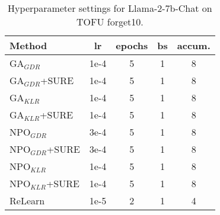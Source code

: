\begin{table}[t]
    \centering
    \small
    \renewcommand{\arraystretch}{1.1}
    \setlength{\tabcolsep}{4pt}
    \begin{tabular}{l|c|c|c|c}
    \hline
    \textbf{Method} & \textbf{lr} & \textbf{epochs} & \textbf{bs} & \textbf{accum.} \\
    \hline
    GA$_{GDR}$ & 1e-4 & 5 & 1 & 8 \\
    GA$_{GDR}$+SURE & 1e-4 & 5 & 1 & 8 \\
    GA$_{KLR}$ & 1e-4 & 5 & 1 & 8 \\
    GA$_{KLR}$+SURE & 1e-4 & 5 & 1 & 8 \\
    NPO$_{GDR}$ & 3e-4 & 5 & 1 & 8 \\
    NPO$_{GDR}$+SURE & 3e-4 & 5 & 1 & 8 \\
    NPO$_{KLR}$ & 1e-4 & 5 & 1 & 8 \\
    NPO$_{KLR}$+SURE & 1e-4 & 5 & 1 & 8 \\
    ReLearn & 1e-5 & 2 & 1 & 4 \\
    \hline
    \end{tabular}
    \caption{Hyperparameter settings for Llama-2-7b-Chat on TOFU forget10.}
    \label{tab:hyperparams_tofu}
\end{table}